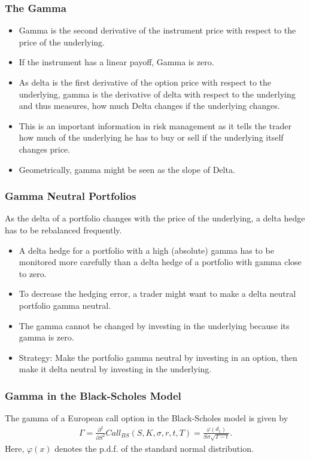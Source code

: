 \begin{frame}[fragile]
\frametitle{The Gamma}
\begin{itemize}
  \item Gamma is the second derivative of the instrument price with respect to
  the price of the underlying.
  \item If the instrument has a linear payoff, Gamma is zero.
  \item As delta is the first derivative of the option price with respect to the
  underlying, gamma is the derivative of delta with respect to the underlying
  and thus measures, how much Delta changes if the underlying changes.
  \item This is an important information in risk management as it tells the
  trader how much of the underlying he has to buy or sell if the underlying
  itself changes price.
  \item Geometrically, gamma might be seen as the slope of Delta.
\end{itemize}
\end{frame}

\begin{frame}[fragile]
\frametitle{Gamma Neutral Portfolios}
As the delta of a portfolio changes with the price of the underlying, a delta
hedge has to be rebalanced frequently.
\begin{itemize}
  \item A delta hedge for a portfolio with a high (absolute) gamma has to be
  monitored more carefully than a delta hedge of a portfolio with gamma close to
  zero.
  \item To decrease the hedging error, a trader might want to make a delta
  neutral portfolio gamma neutral.
  \item The gamma cannot be changed by investing in the underlying because its
  gamma is zero.
  \item Strategy: Make the portfolio gamma neutral by investing in an option,
  then make it delta neutral by investing in the underlying.
\end{itemize}
\end{frame}


\begin{frame}[fragile]
\frametitle{Gamma in the Black-Scholes Model}
The gamma of a European call option in the Black-Scholes model is given by
\begin{align*}
  \Gamma = \frac{\partial^2}{\partial S^2}Call_{BS}(S,K,\sigma,r,t,T) =
  \frac{\varphi(d_1)}{S\sigma \sqrt{T-t}}.
\end{align*}
Here, $\varphi(x)$ denotes the p.d.f. of the standard normal distribution.
\end{frame}


